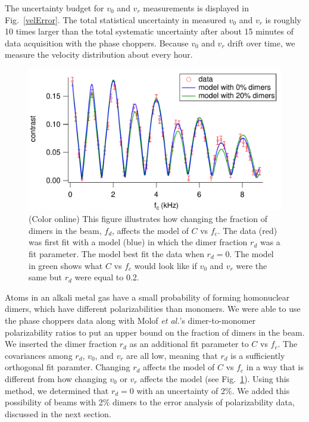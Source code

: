 \documentclass[twocolumn,prl,showpacs,superscriptaddress]{revtex4-1}   %
\newcommand{\figref}[1]{Fig.~\ref{#1}}
\newcommand{\etal}{\textit{et al.}}
\begin{document}
The uncertainty budget for $v_0$ and $v_r$ measurements is displayed in \figref{velError}. 
The total statistical uncertainty in measured $v_0$ and $v_r$ is roughly 10 times larger than the total systematic uncertainty after about 15 minutes of data acquisition with the phase choppers.
Because $v_0$ and $v_r$ drift over time, we measure the velocity distribution about every hour. 

\begin{figure}
\includegraphics[width=\linewidth,keepaspectratio]{CvCFDimers_140924.pdf}
\caption{\label{CvCFDimers}(Color online) This figure illustrates how changing the fraction of dimers in the beam, $f_d$, affects the model of $C$ vs $f_c$. The data (red) was first fit with a model (blue) in which the dimer fraction $r_d$ was a fit parameter. The model best fit the data when $r_d = 0$. The model in green shows what $C$ vs $f_c$ would look like if $v_0$ and $v_r$ were the same but $r_d$ were equal to 0.2.}
\end{figure}

Atoms in an alkali metal gas have a small probability of forming homonuclear dimers, which have different polarizabilities than monomers. 
We were able to use the phase choppers data along with Molof \etal's dimer-to-monomer polarizability ratios \cite{Molof1974} to put an upper bound on the fraction of dimers in the beam. We inserted the dimer fraction $r_d$ as an additional fit parameter to $C$ vs $f_c$.
The covariances among $r_d$, $v_0$, and $v_r$ are all low, meaning that $r_d$ is a sufficiently orthogonal fit paramter. Changing $r_d$ affects the model of $C$ vs $f_c$ in a way that is different from how changing $v_0$ or $v_r$ affects the model (see \figref{CvCFDimers}). 
Using this method, we determined that $r_d = 0$ with an uncertainty of 2\%. We added this possibility of beams with 2\% dimers to the error analysis of polarizability data, discussed in the next section.
\end{document}

